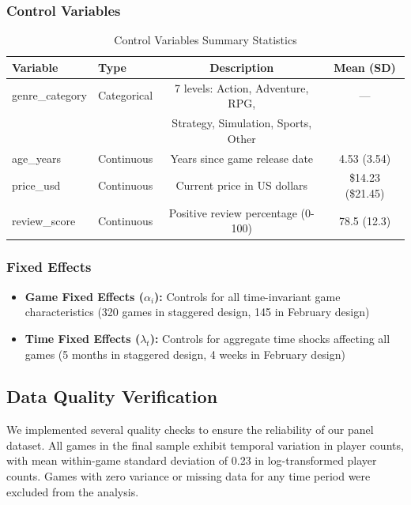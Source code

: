 \documentclass[12pt,a4paper]{article}
\begin{document}
\subsubsection{Control Variables}

\begin{table}[H]
\centering
\caption{Control Variables Summary Statistics}
\begin{tabular}{llcc}
\toprule
\textbf{Variable} & \textbf{Type} & \textbf{Description} & \textbf{Mean (SD)} \\
\midrule
genre\_category & Categorical & 7 levels: Action, Adventure, RPG, & --- \\
 &  & Strategy, Simulation, Sports, Other & \\
age\_years & Continuous & Years since game release date & 4.53 (3.54) \\
price\_usd & Continuous & Current price in US dollars & \$14.23 (\$21.45) \\
review\_score & Continuous & Positive review percentage (0-100) & 78.5 (12.3) \\
\bottomrule
\end{tabular}
\end{table}

\subsubsection{Fixed Effects}

\begin{itemize}
    \item \textbf{Game Fixed Effects ($\alpha_i$):} Controls for all time-invariant game characteristics (320 games in staggered design, 145 in February design)
    \item \textbf{Time Fixed Effects ($\lambda_t$):} Controls for aggregate time shocks affecting all games (5 months in staggered design, 4 weeks in February design)
\end{itemize}

\subsection{Data Quality Verification}

We implemented several quality checks to ensure the reliability of our panel dataset. All games in the final sample exhibit temporal variation in player counts, with mean within-game standard deviation of 0.23 in log-transformed player counts. Games with zero variance or missing data for any time period were excluded from the analysis.
\end{document}
